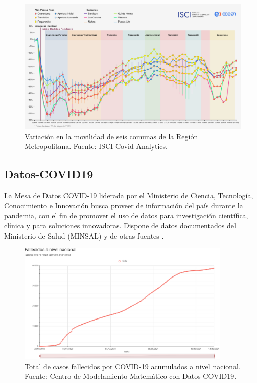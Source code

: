 \begin{figure}[H]
\centering
\includegraphics[width=\textwidth]{img/metodologia/datos/ISCI-movilidad-RM.png}
\caption{Variación en la movilidad de seis comunas de la Región Metropolitana. Fuente: ISCI Covid Analytics.}
\label{img:ISCI-movilidad-RM}
\end{figure}




\subsection{Datos-COVID19}\label{sec:datos-minsal}

La Mesa de Datos COVID-19 liderada por el Ministerio de Ciencia, Tecnología, Conocimiento e Innovación busca proveer de información del país durante la pandemia, con el fin de promover el uso de datos para investigación científica, clínica y para soluciones innovadoras. Dispone de datos documentados del Ministerio de Salud (MINSAL) y de otras fuentes \cite{MINCIENCIA}.


\begin{figure}[H]
\centering
\includegraphics[width=0.9\textwidth]{img/metodologia/datos/fallecidos_nacional.png}
\caption{Total de casos fallecidos por COVID-19 acumulados a nivel nacional. Fuente: Centro de Modelamiento Matemático  con Datos-COVID19.}
\label{img:cmm-fallecidos}
\end{figure}

